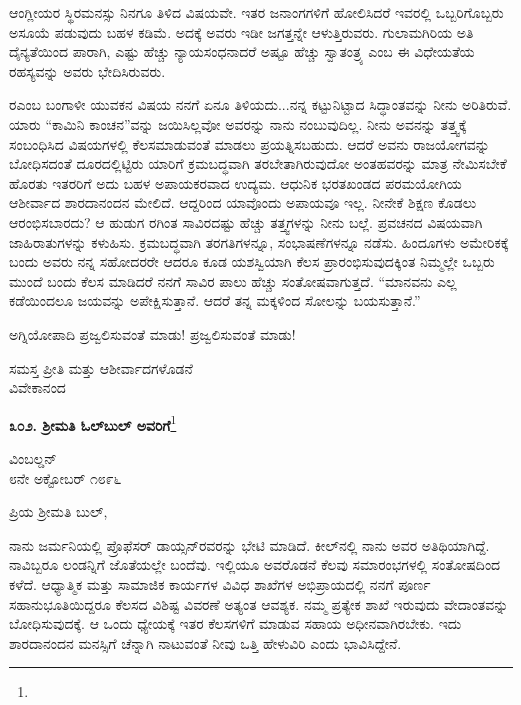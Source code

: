 \vspace{0.1cm}

ಆಂಗ್ಲೀಯರ ಸ್ಥಿರಮನಸ್ಸು ನಿನಗೂ ತಿಳಿದ ವಿಷಯವೇ. ಇತರ ಜನಾಂಗಗಳಿಗೆ ಹೋಲಿಸಿದರೆ ಇವರಲ್ಲಿ ಒಬ್ಬರಿಗೊಬ್ಬರು ಅಸೂಯೆ ಪಡುವುದು ಬಹಳ ಕಡಿಮೆ. ಅದಕ್ಕೆ ಅವರು ಇಡೀ ಜಗತ್ತನ್ನೇ ಆಳುತ್ತಿರುವರು. ಗುಲಾಮಗಿರಿಯ ಅತಿ ದೈನ್ಯತೆಯಿಂದ ಪಾರಾಗಿ, ಎಷ್ಟು ಹೆಚ್ಚು ನ್ಯಾಯಸಂಧನಾದರೆ ಅಷ್ಟೂ ಹೆಚ್ಚು ಸ್ವಾತಂತ್ರ್ಯ ಎಂಬ ಈ ವಿಧೇಯತೆಯ ರಹಸ್ಯವನ್ನು ಅವರು ಭೇದಿಸಿರುವರು.

\vspace{0.1cm}

ರ\enginline{-}ಎಂಬ ಬಂಗಾಳೀ ಯುವಕನ ವಿಷಯ ನನಗೆ ಏನೂ ತಿಳಿಯದು...ನನ್ನ ಕಟ್ಟುನಿಟ್ಟಾದ ಸಿದ್ಧಾಂತವನ್ನು ನೀನು ಅರಿತಿರುವೆ. ಯಾರು “ಕಾಮಿನಿ ಕಾಂಚನ”ವನ್ನು ಜಯಿ\break ಸಿಲ್ಲವೋ ಅವರನ್ನು ನಾನು ನಂಬುವುದಿಲ್ಲ. ನೀನು ಅವನನ್ನು ತತ್ತ್ವಕ್ಕೆ ಸಂಬಂಧಿಸಿದ ವಿಷಯಗಳಲ್ಲಿ ಕೆಲಸಮಾಡುವಂತೆ ಮಾಡಲು ಪ್ರಯತ್ನಿಸಬಹುದು. ಆದರೆ ಅವನು ರಾಜಯೋಗವನ್ನು ಬೋಧಿಸದಂತೆ ದೂರದಲ್ಲಿಟ್ಟಿರು\enginline{-} ಯಾರಿಗೆ ಕ್ರಮಬದ್ಧವಾಗಿ ತರಬೇತಾಗಿರುವುದೋ ಅಂತಹವರನ್ನು ಮಾತ್ರ ನೇಮಿಸಬೇಕೆ ಹೊರತು ಇತರರಿಗೆ ಅದು ಬಹಳ ಅಪಾಯಕರವಾದ ಉದ್ಯಮ. ಆಧುನಿಕ ಭರತಖಂಡದ ಪರಮಯೋಗಿಯ ಆಶೀರ್ವಾದ ಶಾರದಾನಂದನ ಮೇಲಿದೆ. ಆದ್ದರಿಂದ ಯಾವೊಂದು ಅಪಾಯವೂ ಇಲ್ಲ. ನೀನೇಕೆ ಶಿಕ್ಷಣ ಕೊಡಲು ಆರಂಭಿಸಬಾರದು? ಆ ಹುಡುಗ ರ\enginline{-}ಗಿಂತ ಸಾವಿರದಷ್ಟು ಹೆಚ್ಚು ತತ್ತ್ವಗಳನ್ನು ನೀನು ಬಲ್ಲೆ. ಪ್ರವಚನದ ವಿಷಯವಾಗಿ ಜಾಹಿರಾತುಗಳನ್ನು ಕಳುಹಿಸು. ಕ್ರಮಬದ್ಧವಾಗಿ ತರಗತಿಗಳನ್ನೂ, ಸಂಭಾಷಣೆಗಳನ್ನೂ ನಡೆಸು. ಹಿಂದೂಗಳು ಅಮೇರಿಕಕ್ಕೆ ಬಂದು\enginline{-} ಅವರು ನನ್ನ ಸಹೋದರರೇ ಆದರೂ ಕೂಡ\enginline{-} ಯಶಸ್ವಿಯಾಗಿ ಕೆಲಸ ಪ್ರಾರಂಭಿಸುವುದಕ್ಕಿಂತ ನಿಮ್ಮಲ್ಲೇ ಒಬ್ಬರು ಮುಂದೆ ಬಂದು ಕೆಲಸ ಮಾಡಿದರೆ ನನಗೆ ಸಾವಿರ ಪಾಲು ಹೆಚ್ಚು ಸಂತೋಷವಾಗುತ್ತದೆ. ``ಮಾನವನು ಎಲ್ಲ ಕಡೆಯಿಂದಲೂ ಜಯವನ್ನು ಅಪೇಕ್ಷಿಸುತ್ತಾನೆ. ಆದರೆ ತನ್ನ ಮಕ್ಕಳಿಂದ ಸೋಲನ್ನು ಬಯಸುತ್ತಾನೆ.”

\vspace{0.1cm}

ಅಗ್ನಿಯೋಪಾದಿ ಪ್ರಜ್ವಲಿಸುವಂತೆ ಮಾಡು! ಪ್ರಜ್ವಲಿಸುವಂತೆ ಮಾಡು!

{\flushright
ಸಮಸ್ತ ಪ್ರೀತಿ ಮತ್ತು ಆಶೀರ್ವಾದಗಳೊಡನೆ\\ವಿವೇಕಾನಂದ\par}

\begin{center}
\textbf{೩೦೨. ಶ‍್ರೀಮತಿ ಓಲ್‌ಬುಲ್‌ ಅವರಿಗೆ}\footnote{}
\end{center}

\begin{flushright}
ವಿಂಬಲ್ಡನ್\\೮ನೇ ಅಕ್ಟೋಬರ್ ೧೮೯೬
\end{flushright}

\noindent
ಪ್ರಿಯ ಶ‍್ರೀಮತಿ ಬುಲ್,

ನಾನು ಜರ್ಮನಿಯಲ್ಲಿ ಪ್ರೊಫೆಸರ್ ಡಾಯ್ಸನ್‌ರವರನ್ನು ಭೇಟಿ ಮಾಡಿದೆ. ಕೀಲ್‌ನಲ್ಲಿ ನಾನು ಅವರ ಅತಿಥಿಯಾಗಿದ್ದೆ. ನಾವಿಬ್ಬರೂ ಲಂಡನ್ನಿಗೆ ಜೊತೆಯಲ್ಲೇ ಬಂದೆವು. ಇಲ್ಲಿಯೂ ಅವರೊಡನೆ ಕೆಲವು ಸಮಾರಂಭಗಳಲ್ಲಿ ಸಂತೋಷದಿಂದ ಕಳೆದೆ. ಆಧ್ಯಾತ್ಮಿಕ ಮತ್ತು ಸಾಮಾಜಿಕ ಕಾರ್ಯಗಳ ವಿವಿಧ ಶಾಖೆಗಳ ಅಭಿಪ್ರಾಯದಲ್ಲಿ ನನಗೆ ಪೂರ್ಣ ಸಹಾನುಭೂತಿಯಿದ್ದರೂ ಕೆಲಸದ ವಿಶಿಷ್ಟ ವಿವರಣೆ ಅತ್ಯಂತ ಆವಶ್ಯಕ. ನಮ್ಮ ಪ್ರತ್ಯೇಕ ಶಾಖೆ ಇರುವುದು ವೇದಾಂತವನ್ನು ಬೋಧಿಸುವುದಕ್ಕೆ. ಆ ಒಂದು ಧ್ಯೇಯಕ್ಕೆ ಇತರ ಕೆಲಸಗಳಿಗೆ ಮಾಡುವ ಸಹಾಯ ಅಧೀನವಾಗಿರಬೇಕು. ಇದು ಶಾರದಾನಂದನ ಮನಸ್ಸಿಗೆ ಚೆನ್ನಾಗಿ ನಾಟುವಂತೆ ನೀವು ಒತ್ತಿ ಹೇಳುವಿರಿ ಎಂದು ಭಾವಿಸಿದ್ದೇನೆ.

